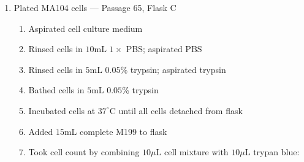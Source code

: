\begin{enumerate}
	\item Plated MA104 cells --- Passage 65, Flask C
		\begin{enumerate}
			\item Aspirated cell culture medium
			\item Rinsed cells in $10$mL $1\times$ PBS; aspirated PBS
			\item Rinsed cells in $5$mL $0.05$\% trypsin; aspirated trypsin
			\item Bathed cells in $5$mL $0.05$\% trypsin
			\item Incubated cells at $37^{\circ}$C until all cells detached from flask
			\item Added $15$mL complete M199 to flask
			\item Took cell count by combining $10\mu$L cell mixture with $10\mu$L trypan blue:
			

\end{enumerate}
\end{enumerate}
